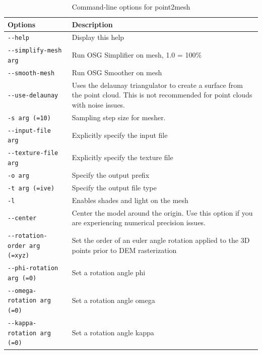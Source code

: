 \begin{longtable}{|l|p{10cm}|}
\caption{Command-line options for point2mesh}
\label{tbl:point2mesh}
\endfirsthead
\endhead
\endfoot
\endlastfoot
\hline
Options & Description \\ \hline \hline
\verb#--help# & Display this help \\ \hline
\verb#--simplify-mesh arg# & Run OSG Simplifier on mesh, 1.0 = 100\% \\ \hline
\verb#--smooth-mesh# & Run OSG Smoother on mesh \\ \hline
\verb#--use-delaunay# & Uses the delaunay triangulator to create a surface from the point cloud. This is not recommended for point clouds with noise issues. \\ \hline
\verb#-s arg (=10)# & Sampling step size for mesher. \\ \hline
\verb#--input-file arg# & Explicitly specify the input file \\ \hline
\verb#--texture-file arg# & Explicitly specify the texture file \\ \hline
\verb#-o arg# & Specify the output prefix \\ \hline
\verb#-t arg (=ive)# & Specify the output file type \\ \hline
\verb#-l# & Enables shades and light on the mesh \\ \hline
\verb#--center# & Center the model around the origin. Use this option if you are experiencing numerical precision issues. \\ \hline
\verb#--rotation-order arg (=xyz)# & Set the order of an euler angle rotation applied to the 3D points prior to DEM rasterization \\ \hline
\verb#--phi-rotation arg (=0)# & Set a rotation angle phi \\ \hline
\verb#--omega-rotation arg (=0)# & Set a rotation angle omega \\ \hline
\verb#--kappa-rotation arg (=0)# & Set a rotation angle kappa \\ \hline
\end{longtable}




